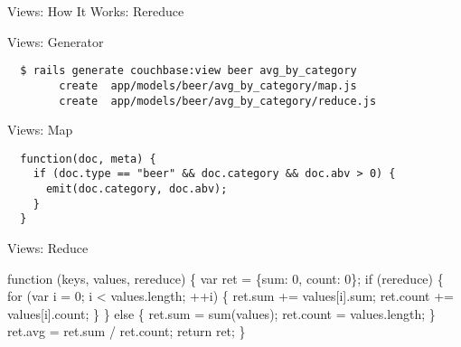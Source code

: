 \documentclass[aspectratio=43]{beamer}
\begin{document}
\begin{frame}[fragile]{Views: How It Works: Rereduce}
\end{frame}

\begin{frame}[fragile]{Views: Generator}
  \begin{verbatim}
  $ rails generate couchbase:view beer avg_by_category
        create  app/models/beer/avg_by_category/map.js
        create  app/models/beer/avg_by_category/reduce.js
  \end{verbatim}
\end{frame}

\begin{frame}[fragile]{Views: Map}
  \begin{verbatim}
  function(doc, meta) {
    if (doc.type == "beer" && doc.category && doc.abv > 0) {
      emit(doc.category, doc.abv);
    }
  }
  \end{verbatim}
\end{frame}

\begin{frame}[fragile]{Views: Reduce}
  \begin{semiverbatim}
  function (keys, values, rereduce) \{
    var ret = \{sum: 0, count: 0\};
    if (\alert<2,3>{rereduce}) \{  
      \alert<3>{for (var i = 0; i < values.length; ++i) \{
        ret.sum += values[i].sum;
        ret.count += values[i].count;
      \}}
    \} else \{
      \alert<2>{ret.sum = sum(values);
      ret.count = values.length;}
    \}
    ret.avg = ret.sum / ret.count;
    return ret;
  \}
  \end{semiverbatim}
\end{frame}
\end{document}

